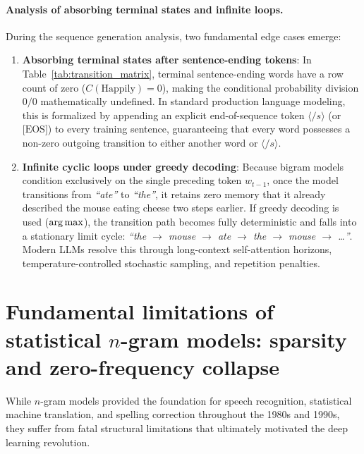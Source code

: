 \documentclass[../../main.tex]{subfiles}
\begin{document}
\paragraph{Analysis of absorbing terminal states and infinite loops.}
During the sequence generation analysis, two fundamental edge cases emerge:
\begin{enumerate}
    \item \textbf{Absorbing terminal states after sentence-ending tokens}:
    In Table~\ref{tab:transition_matrix}, terminal sentence-ending words have a row count of zero ($C(\text{Happily}) = 0$), making the conditional probability division $0/0$ mathematically undefined. In standard production language modeling, this is formalized by appending an explicit end-of-sequence token $\langle /s \rangle$ (or $\text{[EOS]}$) to every training sentence, guaranteeing that every word possesses a non-zero outgoing transition to either another word or $\langle /s \rangle$.
    \item \textbf{Infinite cyclic loops under greedy decoding}:
    Because bigram models condition exclusively on the single preceding token $w_{t-1}$, once the model transitions from \textit{``ate''} to \textit{``the''}, it retains zero memory that it already described the mouse eating cheese two steps earlier. If greedy decoding is used ($\operatorname*{\mathrm{arg\,max}}$), the transition path becomes fully deterministic and falls into a stationary limit cycle: \textit{``the $\to$ mouse $\to$ ate $\to$ the $\to$ mouse $\to$ \dots''}. Modern LLMs resolve this through long-context self-attention horizons, temperature-controlled stochastic sampling, and repetition penalties.
\end{enumerate}


\clearpage
\section{Fundamental limitations of statistical $n$-gram models: sparsity and zero-frequency collapse}
\label{sec:ngram_limitations}

While $n$-gram models provided the foundation for speech recognition, statistical machine translation, and spelling correction throughout the 1980s and 1990s, they suffer from fatal structural limitations that ultimately motivated the deep learning revolution.
\end{document}
